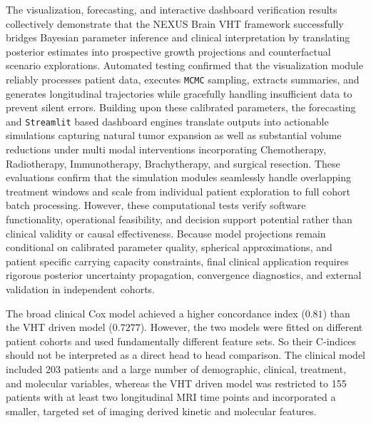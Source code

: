 The visualization, forecasting, and interactive dashboard verification results collectively demonstrate that the NEXUS Brain VHT framework successfully bridges Bayesian parameter inference and clinical interpretation by translating posterior estimates into prospective growth projections and counterfactual scenario explorations. Automated testing confirmed that the visualization module reliably processes patient data, executes \texttt{MCMC} sampling, extracts summaries, and generates longitudinal trajectories while gracefully handling insufficient data to prevent silent errors. Building upon these calibrated parameters, the forecasting and \texttt{Streamlit} based dashboard engines translate outputs into actionable simulations capturing natural tumor expansion as well as substantial volume reductions under multi modal interventions incorporating Chemotherapy, Radiotherapy, Immunotherapy, Brachytherapy, and surgical resection. These evaluations confirm that the simulation modules seamlessly handle overlapping treatment windows and scale from individual patient exploration to full cohort batch processing. However, these computational tests verify software functionality, operational feasibility, and decision support potential rather than clinical validity or causal effectiveness. Because model projections remain conditional on calibrated parameter quality, spherical approximations, and patient specific carrying capacity constraints, final clinical application requires rigorous posterior uncertainty propagation, convergence diagnostics, and external validation in independent cohorts.

The broad clinical Cox model achieved a higher concordance index ($0.81$) than the VHT driven model ($0.7277$). However, the two models were fitted on different patient cohorts and used fundamentally different feature sets. So their C-indices should not be interpreted as a direct head to head comparison. The clinical model included 203 patients and a large number of demographic, clinical, treatment, and molecular variables, whereas the VHT driven model was restricted to 155 patients with at least two longitudinal MRI time points and incorporated a smaller, targeted set of imaging derived kinetic and molecular features.

